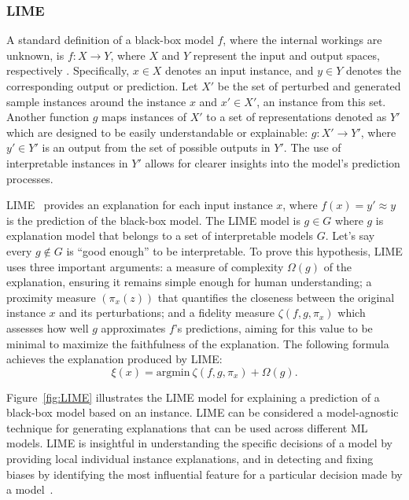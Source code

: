\documentclass[final,5p,times,twocolumn]{elsarticle}
\begin{document}
\subsubsection{LIME} \label{subsection:LIME}
A standard definition of a black-box model $f$, where the internal workings are unknown, is $f: X \rightarrow Y$, where $X$ and $Y$ represent the input and output spaces, respectively \cite{ das2020opportunities,ribeiro2018anchors}. Specifically, $x \in X$ denotes an input instance, and $y \in Y$ denotes the corresponding output or prediction. Let $X'$ be the set of perturbed and generated sample instances around the instance $x$ and $x' \in X'$, an instance from this set. Another function $g$ maps instances of $X'$ to a set of representations denoted as $Y'$ which are designed to be easily understandable or explainable: $g:X' \rightarrow Y'$, where $y' \in Y'$ is an output from the set of possible outputs in $Y'$. The use of interpretable instances in $Y'$ allows for clearer insights into the model's prediction processes.


LIME~\cite{ribeiro2016should} provides an explanation for each input instance $x$, where $f(x)=y' \approx y$ is the prediction of the black-box model. The LIME model is $g \in G$ where $g$ is explanation model that belongs to a set of interpretable models $G$. Let's say every $g \notin G$ is ``good enough'' to be interpretable. To prove this hypothesis, LIME uses three important arguments: a measure of complexity $\Omega(g)$ of the explanation, ensuring it remains simple enough for human understanding; a proximity measure $(\pi_{x}(z))$  that quantifies the closeness between the original instance $x$
and its perturbations; and a fidelity measure $\zeta (f,g,\pi_{x})$ which assesses how well $g$ approximates $ f$'s predictions, aiming for this value to be minimal to maximize the faithfulness of the explanation. The following formula achieves the explanation produced by LIME:
\begin{equation}
	\xi(x)=\text{argmin}~\zeta(f,g,\pi_x) + \Omega(g). \label{eq:LIME}
\end{equation}


Figure~\ref{fig:LIME} illustrates the LIME model for explaining a prediction of a black-box model based on an instance. LIME can be considered a model-agnostic technique for generating explanations
that can be used across different ML models. LIME is insightful in understanding the specific decisions of a model by providing local individual instance explanations, and in detecting and fixing biases by identifying the most influential feature for a particular decision made by a model~\cite{arrieta2020explainable}.
\end{document}
